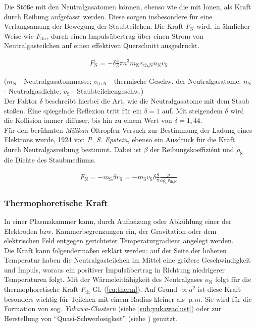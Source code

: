 \documentclass[numbers=noenddot,a4paper]{scrartcl}
\newcommand{\ix}[1]{_\text{#1}}
\newcommand{\tilt}[1]{\textit{#1}}
\begin{document}
			Die Stöße mit den Neutralgasatomen können, ebenso wie die mit Ionen, als Kraft durch Reibung aufgefasst werden. Diese sorgen insbesondere für eine Verlangsamung der Bewegung der Staubteilchen. Die Kraft $F\ix{N}$ wird, in ähnlicher Weise wie $F\ix{dir}$, durch einen Impulsübertrag über einen Strom von Neutralgasteilchen auf einen effektiven Querschnitt ausgedrückt.

				\begin{align}
					F\ix{N}=-\delta\frac{4}{3}\pi a^3m\ix{N}v\ix{th,N}n\ix{N}v\ix{S}
				\end{align}

			($m\ix{N}$ - Neutralgasatommasse; $v\ix{th,N}$ - thermische Geschw. der Neutralgasatome; $n\ix{N}$ - Neutralgasdichte; $v\ix{S}$ - Staubteilchengeschw.)\\
			Der Faktor $\delta$ beschreibt hierbei die Art, wie die Neutralgasatome mit dem Staub stoßen. Eine spiegelnde Reflexion tritt für ein $\delta=1$ auf. Mit steigendem $\delta$ wird die Kollision immer diffuser, bis hin zu einem Wert von $\delta=1,44$.\\
			Für den berühmten \tilt{Milikan}-Öltropfen-Versuch zur Bestimmung der Ladung eines Elektrons wurde, 1924 von \tilt{P. S. Epstein}, ebenso ein Ausdruck für die Kraft durch Neutralgasreibung bestimmt. Dabei ist $\beta$ der Reibungskoeffiziént und $\rho\ix{S}$ die Dichte des Staubmediums.

				\begin{align}
					F\ix{N}=-m\ix{S}\beta v\ix{S}=-m\ix{S}v\ix{S}\delta\frac{8}{\pi}\frac{p}{a\rho\ix{S}v\ix{th,N}}
				\end{align}

		\subsubsection{Thermophoretische Kraft}\label{subsub:therm}

			In einer Plasmakammer kann, durch Aufheizung oder Abkühlung einer der Elektroden bzw. Kammerbegrenzungen ein, der Gravitation oder dem elektrischen Feld entgegen gerichteter Temperaturgradient angelegt werden.\\
			Die Kraft kann folgendermaßen erklärt werden: auf der Seite der höheren Temperatur haben die Neutralgasteilchen im Mittel eine größere Geschwindigkeit und Impuls, woraus ein positiver Impulsübertrag in Richtung niedrigerer Temperaturen folgt.	Mit der Wärmeleitfähigkeit des Neutralgases $\kappa\ix{N}$ folgt für die thermophoretische Kraft $F\ix{th}$ Gl. (\ref{eq:therm}). Auf Grund $\propto a^2$ ist diese Kraft besonders wichtig für Teilchen mit einem Radius kleiner als $\unit{\upmu m}$. Sie wird für die Formation von sog. \tilt{Yukawa-Clustern} (siehe \ref{sub:yukawaclust}) oder zur Herstellung von "`Quasi-Schwerlosigkeit"' (siehe \cite{Rothermel02}) genutzt.
\end{document}
